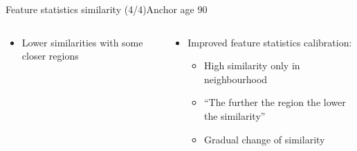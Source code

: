 \begin{frame}{Feature statistics similarity (4/4)}{Anchor age 90}
\begin{columns}
\begin{column}{0.5\textwidth}
\begin{itemize}
				\item Lower similarities with some closer regions
			\end{itemize}
		\end{column}
		\begin{column}{0.5\textwidth}
			\begin{itemize}
				\item Improved feature statistics calibration:
				\begin{itemize}
					\vspace{-1.5em}
					\scriptsize
					\item High similarity only in neighbourhood
					\item ``The further the region the lower the similarity''
					\item Gradual change of similarity
				\end{itemize}
			\end{itemize}
		\end{column}
	\end{columns}
\end{frame}
\endgroup
